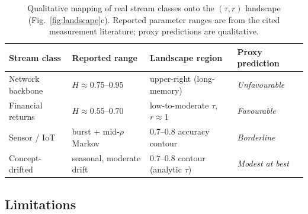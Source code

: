 \documentclass[preprint,12pt,authoryear]{elsarticle}
\begin{document}
\begin{table}[t]
\centering
\caption{Qualitative mapping of real stream classes onto the $(\tau, r)$ landscape (Fig.~\ref{fig:landscape}c). Reported parameter ranges are from the cited measurement literature; proxy predictions are qualitative.}
\label{tab:stream_classes}
\begin{tabular}{@{}llll@{}}
\toprule
Stream class & Reported range & Landscape region & Proxy prediction \\
\midrule
Network backbone & $H \approx 0.75$--$0.95$ & upper-right (long-memory) & \emph{Unfavourable} \\
Financial returns & $H \approx 0.55$--$0.70$ & low-to-moderate $\tau$, $r \approx 1$ & \emph{Favourable} \\
Sensor / IoT & burst + mid-$\rho$ Markov & $0.7$--$0.8$ accuracy contour & \emph{Borderline} \\
Concept-drifted & seasonal, moderate drift & $0.7$--$0.8$ contour (analytic $\tau$) & \emph{Modest at best} \\
\bottomrule
\end{tabular}
\end{table}

\subsection{Limitations}
\end{document}
